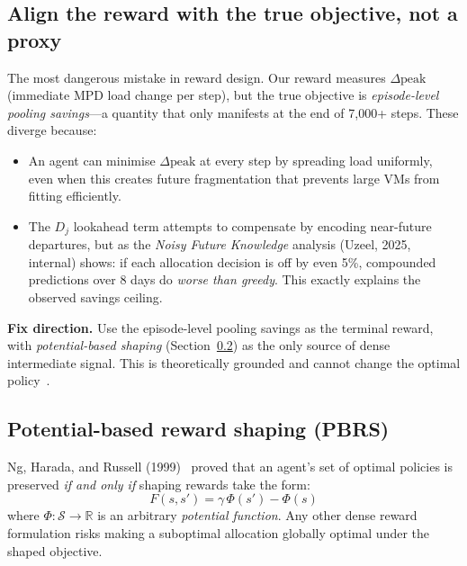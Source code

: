 \documentclass[11pt]{article}
\begin{document}
\subsection{Align the reward with the true objective, not a proxy}

The most dangerous mistake in reward design.
Our reward measures $\Delta\text{peak}$ (immediate MPD load change per step),
but the true objective is \emph{episode-level pooling savings}---a quantity
that only manifests at the end of 7{,}000+ steps.
These diverge because:

\begin{itemize}
  \item An agent can minimise $\Delta\text{peak}$ at every step by spreading
        load uniformly, even when this creates future fragmentation that prevents
        large VMs from fitting efficiently.
  \item The $D_j$ lookahead term attempts to compensate by encoding near-future
        departures, but as the \emph{Noisy Future Knowledge} analysis
        (Uzeel, 2025, internal) shows: if each allocation decision is off by even
        5\%, compounded predictions over 8 days do \emph{worse than greedy}.
        This exactly explains the observed savings ceiling.
\end{itemize}

\noindent\textbf{Fix direction.}
Use the episode-level pooling savings as the terminal reward, with
\emph{potential-based shaping} (Section~\ref{sec:pbrs}) as the only source of
dense intermediate signal.  This is theoretically grounded and cannot change
the optimal policy~\cite{ng1999pbrs}.

\subsection{Potential-based reward shaping (PBRS)}
\label{sec:pbrs}

Ng, Harada, and Russell (1999)~\cite{ng1999pbrs} proved that an agent's set of
optimal policies is preserved \emph{if and only if} shaping rewards take the form:
\begin{equation}
  F(s, s') = \gamma\,\Phi(s') - \Phi(s)
  \label{eq:pbrs}
\end{equation}
where $\Phi : \mathcal{S} \to \mathbb{R}$ is an arbitrary \emph{potential function}.
Any other dense reward formulation risks making a suboptimal allocation globally
optimal under the shaped objective.
\end{document}
